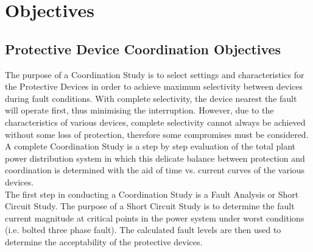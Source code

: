 \section{Objectives}
\label{af:o}

\subsection{Protective Device Coordination Objectives}
\label{af:o:afso}

The purpose of a Coordination Study is to select settings and characteristics for the
Protective Devices in order to achieve maximum selectivity between devices during
fault conditions. With complete selectivity, the device nearest the fault will operate first,
thus minimising the interruption. However, due to the characteristics of various devices,
complete selectivity cannot always be achieved without some loss of protection,
therefore some compromises must be considered.\\

A complete Coordination Study is a step by step evaluation of the total plant power
distribution system in which this delicate balance between protection and coordination is
determined with the aid of time vs. current curves of the various devices.\\

The first step in conducting a Coordination Study is a Fault Analysis or Short Circuit
Study. The purpose of a Short Circuit Study is to determine the fault current magnitude
at critical points in the power system under worst conditions (i.e. bolted three phase
fault). The calculated fault levels are then used to determine the acceptability of the
protective devices.